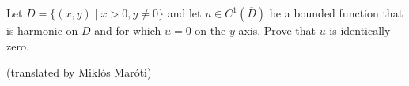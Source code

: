 Let $D=\{ (x,y) \mid x>0, y\neq 0\}$ and let $u\in C^1(\overline {D})$ be a bounded function that is harmonic on $D$ and for which $u=0$ on the $y$-axis. Prove that $u$ is identically zero.

(translated by Miklós Maróti)